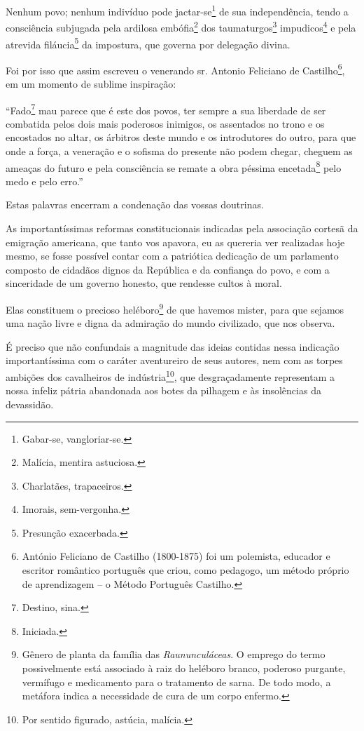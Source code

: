 Nenhum povo; nenhum indivíduo pode jactar-se\footnote{Gabar-se,
  vangloriar-se.} de sua independência, tendo a consciência subjugada
pela ardilosa embófia\footnote{Malícia, mentira astuciosa.} dos
taumaturgos\footnote{Charlatães, trapaceiros.} impudicos\footnote{
  Imorais, sem-vergonha.} e pela atrevida filáucia\footnote{Presunção
  exacerbada.} da impostura, que governa por delegação divina.

Foi por isso que assim escreveu o venerando sr. Antonio Feliciano de
Castilho\footnote{António Feliciano de Castilho (1800-1875) foi um
  polemista, educador e escritor romântico português que criou, como
  pedagogo, um método próprio de aprendizagem -- o Método Português
  Castilho.}, em um momento de sublime inspiração:

``Fado\footnote{Destino, sina.} mau parece que é este dos povos, ter
sempre a sua liberdade de ser combatida pelos dois mais poderosos
inimigos, os assentados no trono e os encostados no altar, os árbitros
deste mundo e os introdutores do outro, para que onde a força, a
veneração e o sofisma do presente não podem chegar, cheguem as ameaças
do futuro e pela consciência se remate a obra péssima
encetada\footnote{Iniciada.} pelo medo e pelo erro.''

Estas palavras encerram a condenação das vossas doutrinas.

As importantíssimas reformas constitucionais indicadas pela associação
cortesã da emigração americana, que tanto vos apavora, eu as quereria
ver realizadas hoje mesmo, se fosse possível contar com a patriótica
dedicação de um parlamento composto de cidadãos dignos da República e da
confiança do povo, e com a sinceridade de um governo honesto, que
rendesse cultos à moral.

Elas constituem o precioso heléboro\footnote{Gênero de planta da
  família das \emph{Raununculáceas}. O emprego do termo possivelmente
  está associado à raiz do heléboro branco, poderoso purgante, vermífugo
  e medicamento para o tratamento de sarna. De todo modo, a metáfora
  indica a necessidade de cura de um corpo enfermo.} de que havemos
mister, para que sejamos uma nação livre e digna da admiração do mundo
civilizado, que nos observa.

É preciso que não confundais a magnitude das ideias contidas nessa
indicação importantíssima com o caráter aventureiro de seus autores, nem
com as torpes ambições dos cavalheiros de indústria\footnote{Por
  sentido figurado, astúcia, malícia.}, que desgraçadamente representam
a nossa infeliz pátria abandonada aos botes da pilhagem e às insolências
da devassidão.

